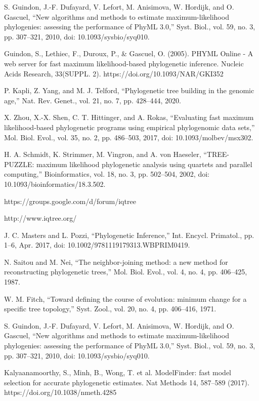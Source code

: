 \documentclass[12pt]{report}
\begin{document}
\begin{thebibliography}{10}
	S. Guindon, J.-F. Dufayard, V. Lefort, M. Anisimova, W. Hordijk, and O. Gascuel, “New algorithms and methods to estimate maximum-likelihood phylogenies: assessing the performance of PhyML 3.0,” Syst. Biol., vol. 59, no. 3, pp. 307–321, 2010, doi: 10.1093/sysbio/syq010.
	
	Guindon, S., Lethiec, F., Duroux, P., & Gascuel, O. (2005). PHYML Online - A web server for fast maximum likelihood-based phylogenetic inference. Nucleic Acids Research, 33(SUPPL. 2). https://doi.org/10.1093/NAR/GKI352
	
	P. Kapli, Z. Yang, and M. J. Telford, “Phylogenetic tree building in the genomic age,” Nat. Rev. Genet., vol. 21, no. 7, pp. 428–444, 2020.
	
    X. Zhou, X.-X. Shen, C. T. Hittinger, and A. Rokas, “Evaluating fast maximum likelihood-based phylogenetic programs using empirical phylogenomic data sets,” Mol. Biol. Evol., vol. 35, no. 2, pp. 486–503, 2017, doi: 10.1093/molbev/msx302.
	
	H. A. Schmidt, K. Strimmer, M. Vingron, and A. von Haeseler, “TREE-PUZZLE: maximum likelihood phylogenetic analysis using quartets and parallel computing,” Bioinformatics, vol. 18, no. 3, pp. 502–504, 2002, doi: 10.1093/bioinformatics/18.3.502.
	
	https://groups.google.com/d/forum/iqtree
	
	http://www.iqtree.org/
	
	J. C. Masters and L. Pozzi, “Phylogenetic Inference,” Int. Encycl. Primatol., pp. 1–6, Apr. 2017, doi: 10.1002/9781119179313.WBPRIM0419.
	
	N. Saitou and M. Nei, “The neighbor-joining method: a new method for reconstructing phylogenetic trees,” Mol. Biol. Evol., vol. 4, no. 4, pp. 406–425, 1987.
	
	W. M. Fitch, “Toward defining the course of evolution: minimum change for a specific tree topology,” Syst. Zool., vol. 20, no. 4, pp. 406–416, 1971.
	
	S. Guindon, J.-F. Dufayard, V. Lefort, M. Anisimova, W. Hordijk, and O. Gascuel, “New algorithms and methods to estimate maximum-likelihood phylogenies: assessing the performance of PhyML 3.0,” Syst. Biol., vol. 59, no. 3, pp. 307–321, 2010, doi: 10.1093/sysbio/syq010.
	
	Kalyaanamoorthy, S., Minh, B., Wong, T. et al. ModelFinder: fast model selection for accurate phylogenetic estimates. Nat Methods 14, 587–589 (2017). https://doi.org/10.1038/nmeth.4285
	

\end{thebibliography}
\end{document}
